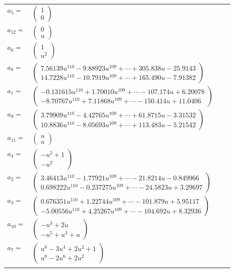 \documentclass[1p]{elsarticle_modified}
\theoremstyle{definition}
\begin{document}
\begin{tabular}{m{7pt} m{180pt} m{7pt} m{180pt} }
\flushright $a_{5}=$&$\begin{pmatrix}1\\0\end{pmatrix}$ \\
\flushright $a_{12}=$&$\begin{pmatrix}0\\u\end{pmatrix}$ \\
\flushright $a_{6}=$&$\begin{pmatrix}1\\u^2\end{pmatrix}$ \\
\flushright $a_{8}=$&$\begin{pmatrix}7.56139 u^{110}-9.88923 u^{109}+\cdots+305.838 u-25.9143\\14.7228 u^{110}-10.7919 u^{109}+\cdots+165.490 u-7.91382\end{pmatrix}$ \\
\flushright $a_{1}=$&$\begin{pmatrix}-0.131615 u^{110}+1.70010 u^{109}+\cdots-107.174 u+6.20078\\-8.70767 u^{110}+7.11868 u^{109}+\cdots-150.414 u+11.0406\end{pmatrix}$ \\
\flushright $a_{9}=$&$\begin{pmatrix}3.79909 u^{110}-4.42765 u^{109}+\cdots+61.8715 u-3.31532\\10.8836 u^{110}-8.05693 u^{109}+\cdots+113.483 u-5.21542\end{pmatrix}$ \\
\flushright $a_{11}=$&$\begin{pmatrix}u\\u\end{pmatrix}$ \\
\flushright $a_{4}=$&$\begin{pmatrix}- u^2+1\\- u^2\end{pmatrix}$ \\
\flushright $a_{2}=$&$\begin{pmatrix}3.46413 u^{110}-1.77921 u^{109}+\cdots-21.8214 u-0.849966\\0.698222 u^{110}-0.237275 u^{109}+\cdots-24.5823 u+3.29697\end{pmatrix}$ \\
\flushright $a_{3}=$&$\begin{pmatrix}0.676351 u^{110}+1.22744 u^{109}+\cdots-101.879 u+5.95117\\-5.00556 u^{110}+4.25267 u^{109}+\cdots-104.692 u+8.32936\end{pmatrix}$ \\
\flushright $a_{10}=$&$\begin{pmatrix}- u^3+2 u\\- u^5+u^3+u\end{pmatrix}$ \\
\flushright $a_{7}=$&$\begin{pmatrix}u^6-3 u^4+2 u^2+1\\u^8-2 u^6+2 u^2\end{pmatrix}$\\&\end{tabular}
\end{document}
